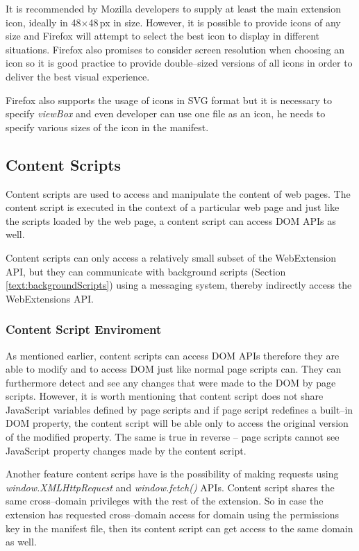 It is recommended by Mozilla developers to supply at least the main extension icon, ideally in 48$\times$48\,px in size. However, it is possible to provide icons of any size and Firefox will attempt to select the best icon to display in different situations. Firefox also promises to consider screen resolution when choosing an icon so it is good practice to provide double--sized versions of all icons in order to deliver the best visual experience. \cite{extensionIcnos}

Firefox also supports the usage of icons in SVG format but it is necessary to specify \textit{viewBox} and even developer can use one file as an icon, he needs to specify various sizes of the icon in the manifest. \cite{extensionIcnos}

\subsection{Content Scripts}
Content scripts are used to access and manipulate the content of web pages. The content script is executed in the context of a particular web page and just like the scripts loaded by the web page, a content script can access DOM APIs as well.

Content scripts can only access a relatively small subset of the WebExtension API, but they can communicate with background scripts (Section \ref{text:backgroundScripts}) using a messaging system, thereby indirectly access the WebExtensions API.

\subsubsection*{Content Script Enviroment}
As mentioned earlier, content scripts can access DOM APIs therefore they are able to modify and to access DOM just like normal page scripts can. They can furthermore detect and see any changes that were made to the DOM by page scripts. However, it is worth mentioning that content script does not share JavaScript variables defined by page scripts and if page script redefines a built--in DOM property, the content script will be able only to access the original version of the modified property. The same is true in reverse -- page scripts cannot see JavaScript property changes made by the content script. \cite{extensionContentScripts}

Another feature content scrips have is the possibility of making requests using \textit{window.XMLHttpRequest} and \textit{window.fetch()} APIs. Content script shares the same cross--domain privileges with the rest of the extension. So in case the extension has requested cross--domain access for domain using the permissions key in the manifest file, then its content script can get access to the same domain as well. \cite{extensionContentScripts}

